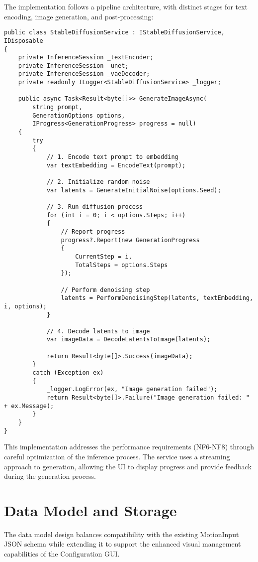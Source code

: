 The implementation follows a pipeline architecture, with distinct stages for text encoding, image generation, and post-processing:

\begin{verbatim}
public class StableDiffusionService : IStableDiffusionService, IDisposable
{
    private InferenceSession _textEncoder;
    private InferenceSession _unet;
    private InferenceSession _vaeDecoder;
    private readonly ILogger<StableDiffusionService> _logger;
    
    public async Task<Result<byte[]>> GenerateImageAsync(
        string prompt, 
        GenerationOptions options,
        IProgress<GenerationProgress> progress = null)
    {
        try
        {
            // 1. Encode text prompt to embedding
            var textEmbedding = EncodeText(prompt);
            
            // 2. Initialize random noise
            var latents = GenerateInitialNoise(options.Seed);
            
            // 3. Run diffusion process
            for (int i = 0; i < options.Steps; i++)
            {
                // Report progress
                progress?.Report(new GenerationProgress 
                { 
                    CurrentStep = i, 
                    TotalSteps = options.Steps 
                });
                
                // Perform denoising step
                latents = PerformDenoisingStep(latents, textEmbedding, i, options);
            }
            
            // 4. Decode latents to image
            var imageData = DecodeLatentsToImage(latents);
            
            return Result<byte[]>.Success(imageData);
        }
        catch (Exception ex)
        {
            _logger.LogError(ex, "Image generation failed");
            return Result<byte[]>.Failure("Image generation failed: " + ex.Message);
        }
    }
}
\end{verbatim}

This implementation addresses the performance requirements (NF6-NF8) through careful optimization of the inference process. The service uses a streaming approach to generation, allowing the UI to display progress and provide feedback during the generation process.

\section{Data Model and Storage}
The data model design balances compatibility with the existing MotionInput JSON schema while extending it to support the enhanced visual management capabilities of the Configuration GUI.


